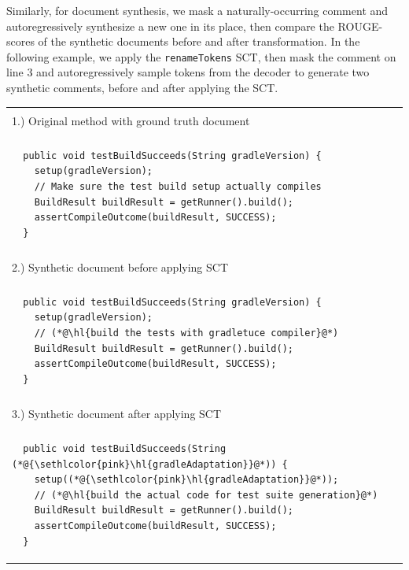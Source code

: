 \documentclass[usenames,dvipsnames]{article} %
\DeclareRobustCommand{\hlred}[1]{{\sethlcolor{pink}\hl{#1}}}
\begin{document}

Similarly, for document synthesis, we mask a naturally-occurring comment and autoregressively synthesize a new one in its place, then compare the ROUGE-scores of the synthetic documents before and after transformation. In the following example, we apply the \lstinline|renameTokens| SCT, then mask the comment on line 3 and autoregressively sample tokens from the decoder to generate two synthetic comments, before and after applying the SCT.

\begin{center}
\begin{tabular}{|p{7.5cm}|}
  \hline\\[-1em]1.) Original method with ground truth document \\[-1em]\\\hline
  \begin{lstlisting}
  public void testBuildSucceeds(String gradleVersion) {
    setup(gradleVersion);
    // Make sure the test build setup actually compiles
    BuildResult buildResult = getRunner().build();
    assertCompileOutcome(buildResult, SUCCESS);
  }
  \end{lstlisting}
  \\\hline\\[-1em]2.) Synthetic document before applying SCT \\[-1em]\\\hline
  \begin{lstlisting}
  public void testBuildSucceeds(String gradleVersion) {
    setup(gradleVersion);
    // (*@\hl{build the tests with gradletuce compiler}@*)
    BuildResult buildResult = getRunner().build();
    assertCompileOutcome(buildResult, SUCCESS);
  }
  \end{lstlisting}
  \\\hline\\[-1em]3.) Synthetic document after applying SCT \\[-1em]\\\hline
  \begin{lstlisting}
  public void testBuildSucceeds(String (*@\hlred{gradleAdaptation}@*)) {
    setup((*@\hlred{gradleAdaptation}@*));
    // (*@\hl{build the actual code for test suite generation}@*)
    BuildResult buildResult = getRunner().build();
    assertCompileOutcome(buildResult, SUCCESS);
  }
  \end{lstlisting}\\\hline
\end{tabular}
\end{center}
\end{document}
